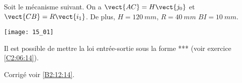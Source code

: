 \normalfalse \difficiletrue \tdifficilefalse
\correctionfalse


\setcounter{question}{0}%
\ifcorrection
\else
{}
\fi
\ifprof
\else
Soit le mécanisme suivant. On a $\vect{AC}=H\vect{j_0}$ et $\vect{CB}=R\vect{i_1}$. De plus, 
$H=\SI{120}{mm}$, $R=\SI{40}{mm}$ $BI=\SI{10}{mm}$.

\begin{marginfigure}
\texttt{[image: 15\_01]}
\end{marginfigure}
\fi


Il est possible de mettre la loi entrée-sortie sous la forme *** (voir exercice \ref{C2:06:14}).

\ifprof
\else
\fi

\ifprof
\else
\fi


\ifprof
\else
\begin{flushright}
\footnotesize{Corrigé  voir \ref{B2:12:14}.}
\end{flushright}%
\fi